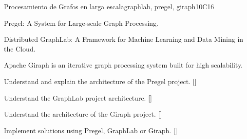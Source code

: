 \begin{syllabus}
\begin{unit}{Procesamiento de Grafos en larga escala}{}{graphlab, pregel, giraph}{10}{C16}
\begin{topics}
    \item Pregel: A System for Large-scale Graph Processing.
    \item Distributed GraphLab: A Framework for Machine Learning and Data Mining in the Cloud.
    \item Apache Giraph is an iterative graph processing system built for high scalability.
\end{topics}
\begin{learningoutcomes}
      \item Understand and explain the architecture of the Pregel project. [\Familiarity]
	  \item Understand the GraphLab project architecture. [\Familiarity]
	  \item Understand the architecture of the Giraph project.  [\Familiarity]
	  \item Implement solutions using Pregel, GraphLab or Giraph. [\Usage]
\end{learningoutcomes}
\end{unit}

\begin{coursebibliography}
\end{coursebibliography}

\end{syllabus}
